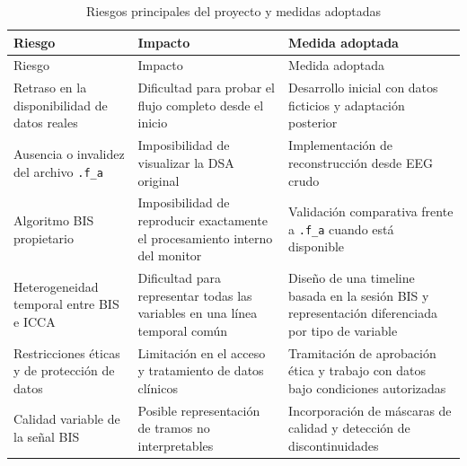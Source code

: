 \documentclass[
  spanish,
  a4paper,
  12pt,
  twoside]{memoir}
\begin{document}
\begin{longtable}[]{@{}
  >{\raggedright\arraybackslash}p{}
  >{\raggedright\arraybackslash}p{}
  >{\raggedright\arraybackslash}p{}@{}}
\caption{Riesgos principales del proyecto y medidas
adoptadas}\label{tbl-riesgos}\tabularnewline
\toprule\noalign{}
\begin{minipage}[b]{\linewidth}\raggedright
Riesgo
\end{minipage} & \begin{minipage}[b]{\linewidth}\raggedright
Impacto
\end{minipage} & \begin{minipage}[b]{\linewidth}\raggedright
Medida adoptada
\end{minipage} \\
\midrule\noalign{}
\endfirsthead
\toprule\noalign{}
\begin{minipage}[b]{\linewidth}\raggedright
Riesgo
\end{minipage} & \begin{minipage}[b]{\linewidth}\raggedright
Impacto
\end{minipage} & \begin{minipage}[b]{\linewidth}\raggedright
Medida adoptada
\end{minipage} \\
\midrule\noalign{}
\endhead
\bottomrule\noalign{}
\endlastfoot
Retraso en la disponibilidad de datos reales & Dificultad para probar el
flujo completo desde el inicio & Desarrollo inicial con datos ficticios
y adaptación posterior \\
Ausencia o invalidez del archivo \texttt{.f\_a} & Imposibilidad de
visualizar la DSA original & Implementación de reconstrucción desde EEG
crudo \\
Algoritmo BIS propietario & Imposibilidad de reproducir exactamente el
procesamiento interno del monitor & Validación comparativa frente a
\texttt{.f\_a} cuando está disponible \\
Heterogeneidad temporal entre BIS e ICCA & Dificultad para representar
todas las variables en una línea temporal común & Diseño de una timeline
basada en la sesión BIS y representación diferenciada por tipo de
variable \\
Restricciones éticas y de protección de datos & Limitación en el acceso
y tratamiento de datos clínicos & Tramitación de aprobación ética y
trabajo con datos bajo condiciones autorizadas \\
Calidad variable de la señal BIS & Posible representación de tramos no
interpretables & Incorporación de máscaras de calidad y detección de
discontinuidades \\
\end{longtable}
\end{document}

